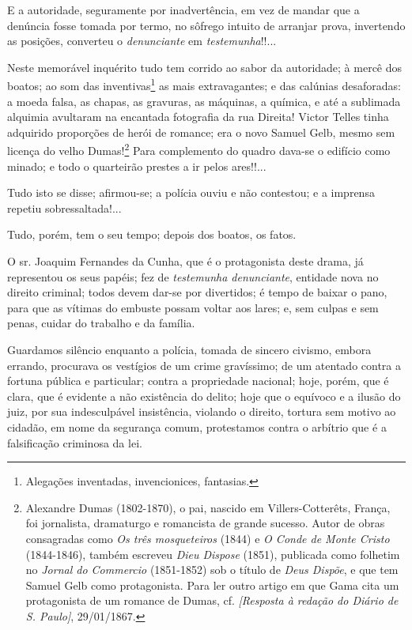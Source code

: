 E a autoridade, seguramente por inadvertência, em vez de mandar que a
denúncia fosse tomada por termo, no sôfrego intuito de arranjar prova,
invertendo as posições, converteu o \emph{denunciante} em
\emph{testemunha}!!...

Neste memorável inquérito tudo tem corrido ao sabor da autoridade; à
mercê dos boatos; ao som das inventivas\footnote{Alegações inventadas,
  invencionices, fantasias.} as mais extravagantes; e das calúnias
desaforadas: a moeda falsa, as chapas, as gravuras, as máquinas, a
química, e até a sublimada alquimia avultaram na encantada fotografia da
rua Direita! Victor Telles tinha adquirido proporções de herói de
romance; era o novo Samuel Gelb, mesmo sem licença do velho
Dumas!\footnote{Alexandre Dumas (1802-1870), o pai, nascido em
  Villers-Cotterêts, França, foi jornalista, dramaturgo e romancista de
  grande sucesso. Autor de obras consagradas como \emph{Os três
  mosqueteiros} (1844) e \emph{O Conde de Monte Cristo} (1844-1846),
  também escreveu \emph{Dieu Dispose} (1851), publicada como folhetim no
  \emph{Jornal do Commercio} (1851-1852) sob o título de \emph{Deus
  Dispõe}, e que tem Samuel Gelb como protagonista. Para ler outro
  artigo em que Gama cita um protagonista de um romance de Dumas, cf.
  \emph{{[}Resposta à redação do Diário de S. Paulo{]}}, 29/01/1867.}
Para complemento do quadro
dava-se o edifício como minado; e todo o quarteirão prestes a ir pelos
ares!!...

Tudo isto se disse; afirmou-se; a polícia ouviu e não contestou; e a
imprensa repetiu sobressaltada!...

Tudo, porém, tem o seu tempo; depois dos boatos, os fatos.

O sr. Joaquim Fernandes da Cunha, que é o protagonista deste drama, já
representou os seus papéis; fez de \emph{testemunha denunciante},
entidade nova no direito criminal; todos devem dar-se por divertidos; é
tempo de baixar o pano, para que as vítimas do embuste possam voltar aos
lares; e, sem culpas e sem penas, cuidar do trabalho e da família.

Guardamos silêncio enquanto a polícia, tomada de sincero civismo, embora
errando, procurava os vestígios de um crime gravíssimo; de um atentado
contra a fortuna pública e particular; contra a propriedade nacional;
hoje, porém, que é clara, que é evidente a não existência do delito;
hoje que o equívoco e a ilusão do juiz, por sua indesculpável
insistência, violando o direito, tortura sem motivo ao cidadão, em nome
da segurança comum, protestamos contra o arbítrio que é a falsificação
criminosa da lei.

